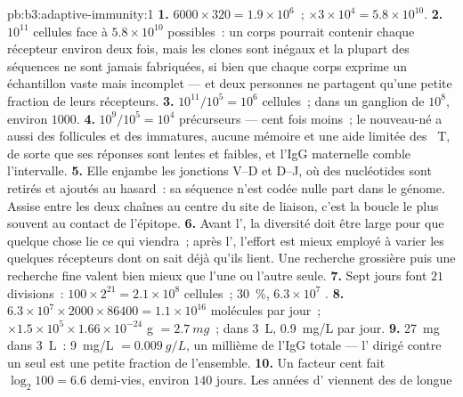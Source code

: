 \begin{solution}{pb:b3:adaptive-immunity:1}
\textbf{1.} $6000\times 320 = 1.9\times 10^{6}$~; $\times 3\times 10^{4}
= 5.8\times 10^{10}$.
\textbf{2.} $10^{11}$ cellules face à $5.8\times 10^{10}$ possibles~: un
corps pourrait contenir chaque récepteur environ deux fois, mais les
clones sont inégaux et la plupart des séquences ne sont jamais
fabriquées, si bien que chaque corps exprime un échantillon vaste mais
incomplet --- et deux personnes ne partagent qu'une petite fraction de
leurs récepteurs.
\textbf{3.} $10^{11}/10^{5} = 10^{6}$ cellules~; dans un ganglion de
$10^{8}$, environ $1000$.
\textbf{4.} $10^{9}/10^{5} = 10^{4}$ précurseurs --- cent fois moins~; le
nouveau-né a aussi des follicules et des 
immatures, aucune mémoire et une aide limitée des ~T, de
sorte que ses réponses sont lentes et faibles, et l'IgG maternelle
comble l'intervalle.
\textbf{5.} Elle enjambe les jonctions V--D et D--J, où des nucléotides
sont retirés et ajoutés au hasard~: sa séquence n'est codée nulle part
dans le génome. Assise entre les deux chaînes au centre du site de
liaison, c'est la boucle le plus souvent au contact de l'épitope.
\textbf{6.} Avant l', la diversité doit être large pour que
quelque chose lie ce qui viendra~; après l', l'effort est mieux
employé à varier les quelques récepteurs dont on sait déjà qu'ils lient.
Une recherche grossière puis une recherche fine valent bien mieux que
l'une ou l'autre seule.
\textbf{7.} Sept jours font $21$ divisions~: $100\times 2^{21} = 2.1\times
10^{8}$ cellules~; \qty{30}{\%}, $6.3\times 10^{7}$ .
\textbf{8.} $6.3\times 10^{7}\times 2000\times \num{86400} = 1.1\times
10^{16}$ molécules par jour~; $\times 1.5\times 10^{5}\times 1.66\times
10^{-24}$ g $= \qty{2.7}{mg}$~; dans \qty{3}{L}, \qty{0.9}{mg/L} par jour.
\textbf{9.} \qty{27}{mg} dans \qty{3}{L}~: \qty{9}{mg/L} $= \qty{0.009}{g/L}$,
un millième de l'IgG totale --- l' dirigé contre un seul
 est une petite fraction de l'ensemble.
\textbf{10.} Un facteur cent fait $\log_{2}100 = 6.6$ demi-vies, environ
$140$ jours. Les années d' viennent des  de longue

\end{solution}
